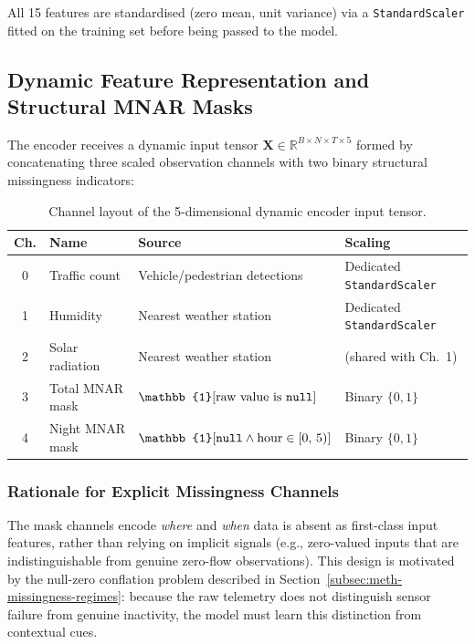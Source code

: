 \noindent All 15 features are standardised (zero mean, unit variance) via a \texttt{StandardScaler} fitted on the training set before being passed to the model.

\subsection{Dynamic Feature Representation and Structural MNAR Masks}
\label{subsec:meth-dynamic-features}

The encoder receives a dynamic input tensor $\mathbf{X} \in \mathbb{R}^{B \times N \times T \times 5}$ formed by concatenating three scaled observation channels with two binary structural missingness indicators:

\begin{table}[htbp]
    \centering
    \caption{Channel layout of the 5-dimensional dynamic encoder input tensor.}
    \label{tab:encoder-channels}
    \begin{tabular}{clll}
        \toprule
        \textbf{Ch.} & \textbf{Name} & \textbf{Source} & \textbf{Scaling} \\
        \midrule
        0 & Traffic count      & Vehicle/pedestrian detections & Dedicated \texttt{StandardScaler} \\
        1 & Humidity           & Nearest weather station       & Dedicated \texttt{StandardScaler} \\
        2 & Solar radiation    & Nearest weather station       & (shared with Ch.~1) \\
        \midrule
        3 & Total MNAR mask    & $\mathbb{1}[\text{raw value is \texttt{null}}]$ & Binary $\{0, 1\}$ \\
        4 & Night MNAR mask    & $\mathbb{1}[\text{\texttt{null}} \wedge \text{hour} \in [0,\,5)]$ & Binary $\{0, 1\}$ \\
        \bottomrule
    \end{tabular}
\end{table}

\subsubsection{Rationale for Explicit Missingness Channels}

The mask channels encode \emph{where} and \emph{when} data is absent as first-class input features, rather than relying on implicit signals (e.g., zero-valued inputs that are indistinguishable from genuine zero-flow observations). This design is motivated by the null-zero conflation problem described in Section~\ref{subsec:meth-missingness-regimes}: because the raw telemetry does not distinguish sensor failure from genuine inactivity, the model must learn this distinction from contextual cues.

